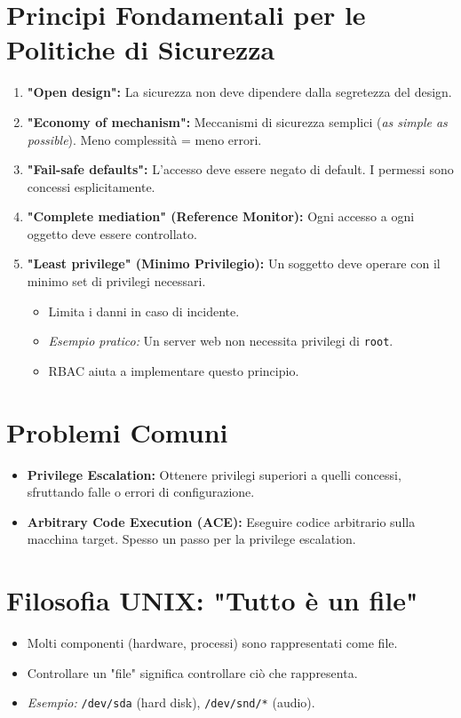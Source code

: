 \documentclass{article}
\begin{document}
\section{Principi Fondamentali per le Politiche di Sicurezza}
\begin{enumerate}
    \item \textbf{"Open design":} La sicurezza non deve dipendere dalla segretezza del design.
    \item \textbf{"Economy of mechanism":} Meccanismi di sicurezza semplici (\textit{as simple as possible}). Meno complessità = meno errori.
    \item \textbf{"Fail-safe defaults":} L'accesso deve essere negato di default. I permessi sono concessi esplicitamente.
    \item \textbf{"Complete mediation" (Reference Monitor):} Ogni accesso a ogni oggetto deve essere controllato.
    \item \textbf{"Least privilege" (Minimo Privilegio):} Un soggetto deve operare con il minimo set di privilegi necessari.
    \begin{itemize}
        \item Limita i danni in caso di incidente.
        \item \textit{Esempio pratico:} Un server web non necessita privilegi di \texttt{root}.
        \item RBAC aiuta a implementare questo principio.
    \end{itemize}
\end{enumerate}

\section{Problemi Comuni}
\begin{itemize}
    \item \textbf{Privilege Escalation:} Ottenere privilegi superiori a quelli concessi, sfruttando falle o errori di configurazione.
    \item \textbf{Arbitrary Code Execution (ACE):} Eseguire codice arbitrario sulla macchina target. Spesso un passo per la privilege escalation.
\end{itemize}

\section{Filosofia UNIX: "Tutto è un file"}
\begin{itemize}
    \item Molti componenti (hardware, processi) sono rappresentati come file.
    \item Controllare un "file" significa controllare ciò che rappresenta.
    \item \textit{Esempio:} \texttt{/dev/sda} (hard disk), \texttt{/dev/snd/*} (audio).
\end{itemize}
\end{document}
